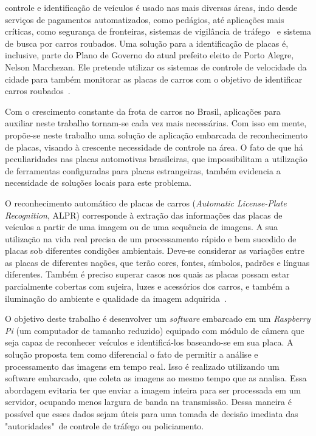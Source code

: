 \cite{WinNT} controle e identificação de veículos é usado nas mais diversas áreas, indo
desde serviços de pagamentos automatizados, como pedágios, até aplicações mais
críticas, como segurança de fronteiras, sistemas de vigilância de
tráfego~\cite{ahmad2015automatic} e sistema de busca por carros roubados.
Uma solução para a identificação de placas é, inclusive,  parte do Plano de Governo do atual prefeito eleito de Porto Alegre,
Nelson Marchezan. Ele pretende utilizar os sistemas de controle de velocidade da cidade para também
monitorar as placas de carros com o objetivo de identificar carros roubados~\cite{psdb2016marchezan}.

Com o crescimento constante da frota de carros no Brasil, aplicações para
auxiliar neste trabalho tornam-se cada vez
mais necessárias. Com isso em mente, propõe-se neste trabalho uma
solução de aplicação embarcada de reconhecimento de placas, visando
à crescente necessidade de controle na área. O fato de que há
peculiaridades nas placas automotivas
brasileiras, que impossibilitam a utilização de ferramentas configuradas
para placas estrangeiras, também evidencia a necessidade de soluções
locais para este problema.

O reconhecimento automático de placas de carros (\emph{Automatic License-Plate
Recognition}, ALPR) corresponde à extração
das informações das placas de veículos a partir
de uma imagem ou de uma sequência de imagens. A sua utilização na vida real
precisa de um processamento rápido e bem sucedido de placas sob diferentes
condições ambientais. Deve-se considerar as variações entre as placas de
diferentes nações, que terão cores, fontes, símbolos, padrões e línguas
diferentes. Também é preciso superar casos nos quais as placas possam estar
parcialmente cobertas com sujeira, luzes e acessórios dos
carros, e também a iluminação do ambiente e qualidade
da imagem adquirida~\cite{s2013automatic}.

O objetivo deste trabalho é desenvolver um \emph{software} embarcado em um \emph{Raspberry Pi}
(um computador de tamanho reduzido) equipado com módulo de câmera que seja
capaz de reconhecer veículos e identificá-los baseando-se em sua
placa. A solução proposta tem como diferencial o fato de permitir a
análise e processamento das imagens em tempo real. Isso é realizado utilizando um software embarcado, que coleta as imagens ao mesmo tempo
que as analisa. Essa abordagem evitaria ter que enviar a imagem inteira para ser processada em um servidor, ocupando menos largura de banda na transmissão. Dessa maneira é possível que esses dados sejam úteis para uma tomada de decisão imediata das "autoridades"~de controle de tráfego ou policiamento.

